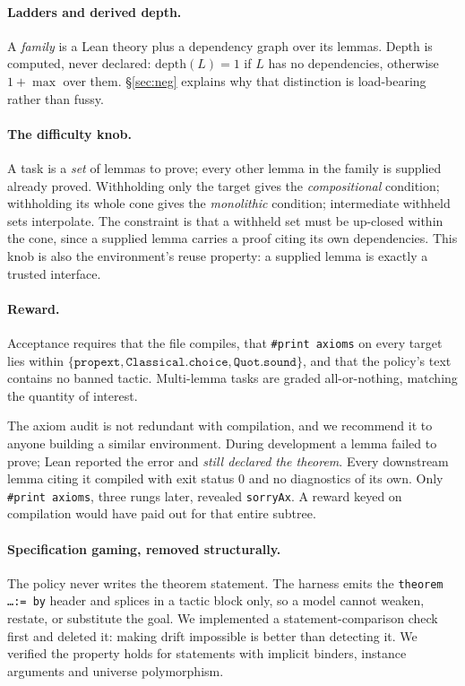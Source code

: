 \documentclass[10pt]{article}
\begin{document}
\paragraph{Ladders and derived depth.}
A \emph{family} is a Lean theory plus a dependency graph over its lemmas. Depth
is computed, never declared: $\mathrm{depth}(L)=1$ if $L$ has no dependencies,
otherwise $1+\max$ over them. \S\ref{sec:neg} explains why that distinction is
load-bearing rather than fussy.

\paragraph{The difficulty knob.}
A task is a \emph{set} of lemmas to prove; every other lemma in the family is
supplied already proved. Withholding only the target gives the
\emph{compositional} condition; withholding its whole cone gives the
\emph{monolithic} condition; intermediate withheld sets interpolate. The
constraint is that a withheld set must be up-closed within the cone, since a
supplied lemma carries a proof citing its own dependencies. This knob is also
the environment's reuse property: a supplied lemma is exactly a trusted
interface.

\paragraph{Reward.}
Acceptance requires that the file compiles, that \texttt{\#print axioms} on
every target lies within
$\{\texttt{propext},\texttt{Classical.choice},\texttt{Quot.sound}\}$, and that
the policy's text contains no banned tactic. Multi-lemma tasks are graded
all-or-nothing, matching the quantity of interest.

The axiom audit is not redundant with compilation, and we recommend it to
anyone building a similar environment. During development a lemma failed to
prove; Lean reported the error and \emph{still declared the theorem}. Every
downstream lemma citing it compiled with exit status $0$ and no diagnostics of
its own. Only \texttt{\#print axioms}, three rungs later, revealed
\texttt{sorryAx}. A reward keyed on compilation would have paid out for that
entire subtree.

\paragraph{Specification gaming, removed structurally.}
The policy never writes the theorem statement. The harness emits the
\texttt{theorem \ldots := by} header and splices in a tactic block only, so a
model cannot weaken, restate, or substitute the goal. We implemented a
statement-comparison check first and deleted it: making drift impossible is
better than detecting it. We verified the property holds for statements with
implicit binders, instance arguments and universe polymorphism.
\end{document}
